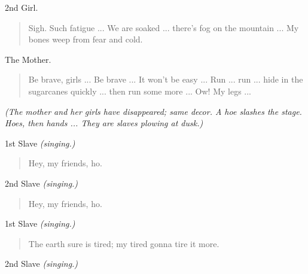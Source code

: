 \documentclass[letterpaper,article,12pt,oneside,notitlepage]{memoir}
\begin{document}
\begin{center}2nd Girl.\end{center}

\begin{verse}
\indent Sigh. Such fatigue ... We are soaked ... there's fog on the mountain ... My bones weep from fear and cold. \\
\end{verse}

\begin{center}The Mother.\end{center}

\begin{verse}
Be brave, girls ... Be brave ... It won't be easy ... Run ... run ... hide in the sugarcanes quickly ... then run some more ... Ow! My legs ...
\end{verse}

\textit{(The mother and her girls have disappeared; same decor. A hoe slashes the stage. Hoes, then hands ... They are slaves plowing at dusk.)}

\begin{center}1st Slave \textit{(singing.)}\end{center}

\begin{verse}
\hspace{1cm} Hey, my friends, ho. \\
\end{verse}

\begin{center}2nd Slave \textit{(singing.)}\end{center}

\begin{verse}
\hspace{1cm} Hey, my friends, ho. \\
\end{verse}

\clearpage

\begin{center}1st Slave \textit{(singing.)}\end{center}

\begin{verse}
\hspace{1cm} The earth sure is tired; my tired gonna tire it more. \\
\end{verse}

\begin{center}2nd Slave \textit{(singing.)}\end{center}
\end{document}
